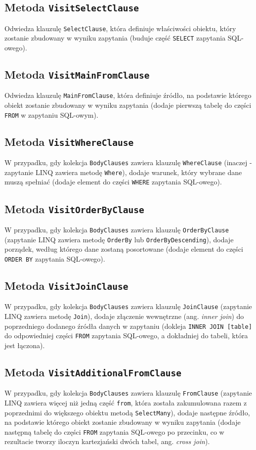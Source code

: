 \subsection{Metoda \texttt{VisitSelectClause}}
Odwiedza klauzulę \texttt{SelectClause}, która definiuje właściwości obiektu, który zostanie zbudowany w wyniku zapytania (buduje część \texttt{SELECT} zapytania SQL-owego).

\subsection{Metoda \texttt{VisitMainFromClause}}
Odwiedza klauzulę \texttt{MainFromClause}, która definiuje źródło, na podstawie którego obiekt zostanie zbudowany w wyniku zapytania (dodaje pierwszą tabelę do części \texttt{FROM} w zapytaniu SQL-owym).

\subsection{Metoda \texttt{VisitWhereClause}}
W przypadku, gdy kolekcja \texttt{BodyClauses} zawiera klauzulę \texttt{WhereClause} (inaczej - zapytanie LINQ zawiera metodę \texttt{Where}), dodaje warunek, który wybrane dane muszą spełniać (dodaje element do części \texttt{WHERE} zapytania SQL-owego).

\subsection{Metoda \texttt{VisitOrderByClause}}
W przypadku, gdy kolekcja \texttt{BodyClauses} zawiera klauzulę \texttt{OrderByClause} (zapytanie LINQ zawiera metodę \texttt{OrderBy} lub \texttt{OrderByDescending}), dodaje porządek, według którego dane zostaną posortowane (dodaje element do części \texttt{ORDER BY} zapytania SQL-owego).

\subsection{Metoda \texttt{VisitJoinClause}}
W przypadku, gdy kolekcja \texttt{BodyClauses} zawiera klauzulę \texttt{JoinClause} (zapytanie LINQ zawiera metodę \texttt{Join}), dodaje złączenie wewnętrzne (ang. \textit{inner join}) do poprzedniego dodanego źródła danych w zapytaniu (dokleja \texttt{INNER JOIN [table]} do odpowiedniej części \texttt{FROM} zapytania SQL-owego, a dokładniej do tabeli, która jest łączona).

\subsection{Metoda \texttt{VisitAdditionalFromClause}}
W przypadku, gdy kolekcja \texttt{BodyClauses} zawiera klauzulę \texttt{FromClause} (zapytanie LINQ zawiera więcej niż jedną część \texttt{from}, która została zakumulowana razem z poprzednimi do większego obiektu metodą \texttt{SelectMany}), dodaje następne źródło, na podstawie którego obiekt zostanie zbudowany w wyniku zapytania (dodaje następną tabelę do części \texttt{FROM} zapytania SQL-owego po przecinku, co w rezultacie tworzy iloczyn kartezjański dwóch tabel, ang. \textit{cross join}).

